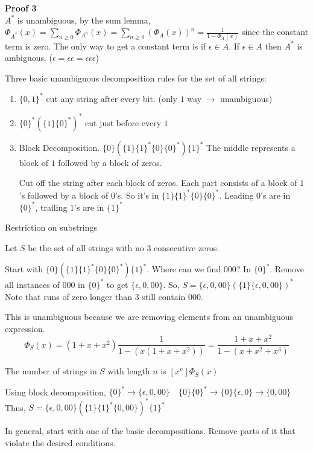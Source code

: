 \documentclass{article}
\begin{document}
\textbf{Proof 3\\}
$A^*$ is unambiguous, by the sum lemma, $\Phi_{A^*}(x) = \sum_{n \ge 0}\Phi_{A^n}(x) = \sum_{n \ge 0}(\Phi_A(x))^n = \frac{1}{1 - \Phi_A(x)}$ since the constant term is zero. The only way to get a constant term is if $\epsilon \in A$. If $\epsilon \in A$ then $A^*$ is ambiguous. ($\epsilon = \epsilon \epsilon = \epsilon \epsilon \epsilon$)

Three basic unambiguous decomposition rules for the set of all strings:
\begin{enumerate}
	\item $\{ 0,1 \}^*$ cut any string after every bit. (only $1$ way $\rightarrow$ unambiguous)
	\item $\{ 0 \}^*(\{1\}\{0\}^*)^*$ cut just before every $1$
	\item Block Decomposition. $\{0\}(\{1\}\{1\}^*\{0\}\{0\}^*)\{1\}^*$ The middle represents a block of $1$ followed by a block of zeros.

		Cut off the string after each block of zeros. Each part consists of a block of $1$'s followed by a block of $0$'s. So it's in $\{1\}\{1\}^*\{0\}\{0\}^*$. Leading $0$'s are in $\{0\}^*$, trailing $1$'s are in $\{1\}^*$
\end{enumerate}

Restriction on substrings

\example
Let $S$ be the set of all strings with no $3$ consecutive zeros.

Start with $\{0\}(\{1\}\{1\}^*\{0\}\{0\}^*)\{1\}^*$. Where can we find $000$? In $\{0\}^*$. Remove all instances of $000$ in $\{0\}^*$ to get $\{ \epsilon , 0, 00 \}$. So, $S = \{ \epsilon , 0, 00 \}(\{1\}\{ \epsilon , 0,00\})^*$ Note that runs of zero longer than $3$ still contain $000$.

This is unambiguous because we are removing elements from an unambiguous expression.
$$\Phi_S(x) = (1+x+x^2)\frac{1}{1-(x(1+x+x^2))} = \frac{1 + x+x^2}{1-(x+x^2+x^3)}$$

The number of strings in $S$ with length $n$ is $[x^n]\Phi_S(x)$

Using block decomposition, $\{0\}^* \rightarrow \{ \epsilon , 0,00 \} \quad \{0\}\{0\}^* \rightarrow \{0\}\{ \epsilon, 0\} \rightarrow \{0,00\}$ Thus, $S = \{ \epsilon,0,00\}(\{1\}\{1\}^*\{0,00\})^*\{1\}^*$

In general, start with one of the basic decompositions. Remove parts of it that violate the desired conditions.
\end{document}
